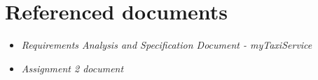 \section{Referenced documents}
\begin{itemize}
	\item \textit{Requirements Analysis and Specification Document - myTaxiService}
	\item \textit{Assignment 2 document}
\end{itemize}